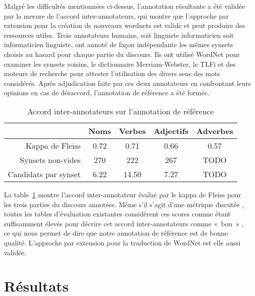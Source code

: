 Malgré les difficultés mentionnées ci-dessus, l'annotation résultante a été
validée par la mesure de l'accord inter-annotateurs, qui montre que l'approche
par extension pour la création de nouveaux wordnets est valide et peut produire
des ressources utiles. Trois annotateurs humains, soit linguiste informaticien
soit informaticien linguiste, ont annoté de façon indépendante les mêmes
synsets choisis au hasard pour chaque partie du discours. Ils ont utilisé
WordNet pour examiner les synsets voisins, le dictionnaire Merriam-Webster, le
TLFi \citep{TLFi} et des moteurs de recherche pour attester l'utilisation des
divers sens des mots considérés. Après adjudication faite par ces deux
annotateurs en confrontant leurs opinions en cas de désaccord, l'annotation de
référence a été formée.

\begin{table}[ht]
\centering
\begin{tabular}{rcccc}
  \toprule
                        & Noms    & Verbes  & Adjectifs & Adverbes\\
  \midrule
  Kappa de Fleiss       & 0.72    & 0.71    & 0.66      & 0.57 \\
  Synsets non-vides     & 270     & 222     & 267       & TODO \\
  Candidats par synset  & 6.22    & 14.50   & 7.27      & TODO \\
  \bottomrule
\end{tabular}
\caption{\label{table:kappa}Accord inter-annotateurs sur l'annotation de référence}
\end{table}

La table~\ref{table:kappa} montre l'accord inter-annotateur évalué par le kappa
de Fleiss pour les trois parties du discours annotées. Même s'il s'agit d'une
métrique discutée \citep{powers2012problem}, toutes les tables d'évaluation
existantes considèrent ces scores comme étant suffisamment élevés pour décrire
cet accord inter-annotateurs comme «~bon~» \citep{gwet2001handbook}, ce qui
nous permet de dire que notre annotation de référence est de bonne qualité.
L'approche par extension pour la traduction de WordNet est elle aussi validée.

\section{Résultats}
\label{sec:results}

